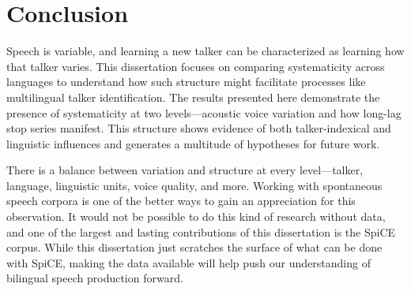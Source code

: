 

\section{Conclusion}\label{ch5:sec:conclusion}

Speech is variable, and learning a new talker can be characterized as learning how that talker varies. This dissertation focuses on comparing systematicity across languages to understand how such structure might facilitate processes like multilingual talker identification. The results presented here demonstrate the presence of systematicity at two levels---acoustic voice variation and how long-lag stop series manifest. This structure shows evidence of both talker-indexical and linguistic influences and generates a multitude of hypotheses for future work. 

There is a balance between variation and structure at every level---talker, language, linguistic units, voice quality, and more. Working with spontaneous speech corpora is one of the better ways to gain an appreciation for this observation. It would not be possible to do this kind of research without data, and one of the largest and lasting contributions of this dissertation is the SpiCE corpus. While this dissertation just scratches the surface of what can be done with SpiCE, making the data available will help push our understanding of bilingual speech production forward. 

\endinput %
